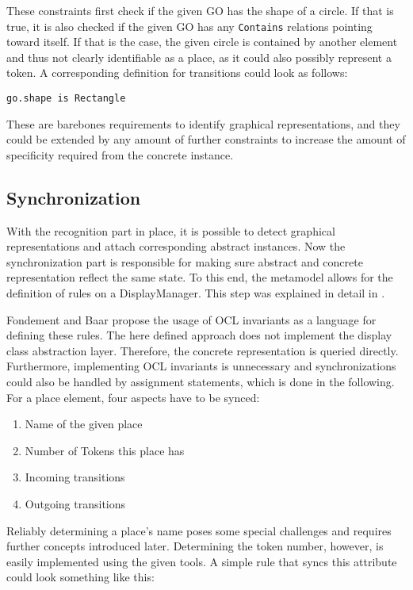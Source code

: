 These constraints first check if the given GO has the shape of a circle. If that is true, it is also checked if the given GO has any \texttt{Contains} relations pointing toward itself. If that is the case, the given circle is contained by another element and thus not clearly identifiable as a place, as it could also possibly represent a token. A corresponding definition for transitions could look as follows:

\begin{lstlisting}[captionpos=b,caption={Simple constraint to check for transition representations},label={lst:transition-constraints}]
go.shape is Rectangle
\end{lstlisting}

These are barebones requirements to identify graphical representations, and they could be extended by any amount of further constraints to increase the amount of specificity required from the concrete instance.

\subsection{Synchronization}
With the recognition part in place, it is possible to detect graphical representations and attach corresponding abstract instances. Now the synchronization part is responsible for making sure abstract and concrete representation reflect the same state. To this end, the metamodel allows for the definition of rules on a DisplayManager. This step was explained in detail in \cite{fondement_making_2005}. 

Fondement and Baar propose the usage of OCL invariants as a language for defining these rules. The here defined approach does not implement the display class abstraction layer. Therefore, the concrete representation is queried directly. Furthermore, implementing OCL invariants is unnecessary and synchronizations could also be handled by assignment statements, which is done in the following. For a place element, four aspects have to be synced:

\begin{enumerate}
  \item Name of the given place
  \item Number of Tokens this place has
  \item Incoming transitions
  \item Outgoing transitions
\end{enumerate}

Reliably determining a place's name poses some special challenges and requires further concepts introduced later. Determining the token number, however, is easily implemented using the given tools. A simple rule that syncs this attribute could look something like this:

